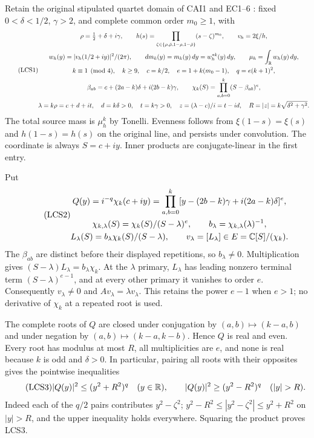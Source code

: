 \documentclass[11pt,a4paper]{article}
\begin{document}
Retain the original stipulated quartet domain of CAI1 and EC1--6
\cite{a04lcs:cai,a04lcs:ec}: fixed $0<\delta<1/2$, $\gamma>2$, and complete common
order $m_0\ge1$, with
\begin{equation}\tag{LCS1}
\begin{gathered}
 \rho=\tfrac12+\delta+i\gamma,\qquad
 h(s)=\prod_{\zeta\in\{\rho,\bar\rho,1-\rho,1-\bar\rho\}}
                      (s-\zeta)^{m_0},\qquad v_h=2\xi/h,\\
 w_h(y)=|v_h(1/2+iy)|^2/(2\pi),\qquad
 dm_k(y)=m_k(y)\,dy=w_h^{*k}(y)\,dy,\qquad
 \mu_h=\int_\mathbb R w_h(y)\,dy,\\
 k\equiv1\pmod4,\quad k\ge9,\quad c=k/2,\quad
 e=1+k(m_0-1),\quad q=e(k+1)^2,\\
 \beta_{ab}=c+(2a-k)\delta+i(2b-k)\gamma,\qquad
 \chi_k(S)=\prod_{a,b=0}^k(S-\beta_{ab})^e,\\
 \lambda=k\rho=c+d+it,\quad d=k\delta>0,\quad t=k\gamma>0,\quad
 z=(\lambda-c)/i=t-id,\quad R=|z|=k\sqrt{\delta^2+\gamma^2}.
\end{gathered}
\end{equation}
The total source mass is $\mu_h^k$ by Tonelli. Evenness follows from
$\xi(1-s)=\xi(s)$ and $h(1-s)=h(s)$ on the original line, and persists
under convolution. The coordinate is always $S=c+iy$. Inner products
are conjugate-linear in the first entry.

Put
\begin{equation}\tag{LCS2}
\begin{gathered}
 Q(y)=i^{-q}\chi_k(c+iy)
   =\prod_{a,b=0}^k
      [y-(2b-k)\gamma+i(2a-k)\delta]^e,\\
 \chi_{k,\lambda}(S)=\chi_k(S)/(S-\lambda)^e,\qquad
 b_\lambda=\chi_{k,\lambda}(\lambda)^{-1},\\
 L_\lambda(S)=b_\lambda\chi_k(S)/(S-\lambda),\qquad
 v_\lambda=[L_\lambda]\in E=\mathbb C[S]/(\chi_k).
\end{gathered}
\end{equation}
The $\beta_{ab}$ are distinct before their displayed repetitions, so
$b_\lambda\ne0$. Multiplication gives
$(S-\lambda)L_\lambda=b_\lambda\chi_k$. At the $\lambda$ primary,
$L_\lambda$ has leading nonzero terminal term
$(S-\lambda)^{e-1}$, and at every other primary it vanishes to order
$e$. Consequently $v_\lambda\ne0$ and $Av_\lambda=\lambda v_\lambda$.
This retains the power $e-1$ when $e>1$; no derivative of $\chi_k$ at
a repeated root is used.

The complete roots of $Q$ are closed under conjugation by
$(a,b)\mapsto(k-a,b)$ and under negation by
$(a,b)\mapsto(k-a,k-b)$. Hence $Q$ is real and even. Every root has
modulus at most $R$, all multiplicities are $e$, and none is real
because $k$ is odd and $\delta>0$. In particular, pairing all roots
with their opposites gives the pointwise inequalities
\begin{equation}\tag{LCS3}
 |Q(y)|^2\le(y^2+R^2)^q\quad(y\in\R),\qquad
 |Q(y)|^2\ge(y^2-R^2)^q\quad(|y|>R).
\end{equation}
Indeed each of the $q/2$ pairs contributes $y^2-\zeta^2$;
$y^2-R^2\le|y^2-\zeta^2|\le y^2+R^2$ on $|y|>R$, and the upper
inequality holds everywhere. Squaring the product proves LCS3.
\end{document}
